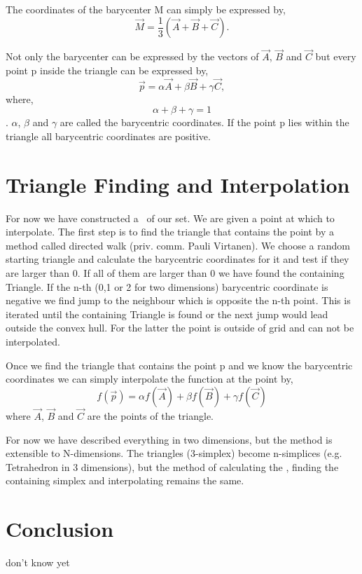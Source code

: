 The coordinates of the barycenter M can simply be expressed by,
\[
\vec{M} = \frac{1}{3} (\vec{A} + \vec{B} + \vec{C}).
\]

Not only the barycenter can be expressed by the vectors of $\vec{A}$, $\vec{B}$ and $\vec{C}$ but every point p inside the triangle can be expressed by,
\[
\vec{p} = \alpha\vec{A} + \beta\vec{B} + \gamma\vec{C},
\]
where,
\[
\alpha + \beta + \gamma = 1
\]
. $\alpha$, $\beta$ and $\gamma$ are called the barycentric coordinates. If the point p lies within the triangle all barycentric coordinates are positive. 

\section{Triangle Finding and Interpolation}

For now we have constructed a \deltri\ of our set. We are given a point at which to interpolate. The first step is to find the triangle that contains the point by a method called directed walk (priv. comm. Pauli Virtanen). We choose a random starting triangle and calculate the barycentric coordinates for it and test if they are larger than 0. If all of them are larger than 0 we have found the containing Triangle. If the n-th (0,1 or 2 for two dimensions) barycentric coordinate is negative we find jump to the neighbour which is opposite the n-th point. This is iterated until the containing Triangle is found or the next jump would lead outside the convex hull. For the latter the point is outside of grid and can not be interpolated.

Once we find the triangle that contains the point p and we know the barycentric coordinates we can simply interpolate the function at the point by,
\[
f(\vec{p})=\alpha f(\vec{A}) + \beta f(\vec{B}) + \gamma f(\vec{C})
\]
where  $\vec{A}$, $\vec{B}$ and $\vec{C}$ are the points of the triangle. 

For now we have described everything in two dimensions, but the method is extensible to N-dimensions. The triangles (3-simplex) become n-simplices (e.g. Tetrahedron in 3 dimensions), but the method of calculating the \deltri, finding the containing simplex and interpolating remains the same.

\section{Conclusion}

don't know yet 


